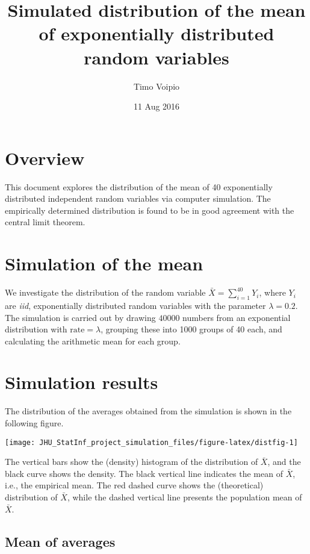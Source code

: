 \documentclass[12pt,a4paper]{article}
\title{Simulated distribution of the mean of exponentially distributed random
variables}
\author{Timo Voipio}
\date{11 Aug 2016}
\begin{document}
\maketitle

\section{Overview}\label{overview}

This document explores the distribution of the mean of 40 exponentially
distributed independent random variables via computer simulation. The
empirically determined distribution is found to be in good agreement
with the central limit theorem.

\section{Simulation of the mean}\label{simulation-of-the-mean}

We investigate the distribution of the random variable
\(\bar{X} = \sum_{i=1}^{40} Y_i\), where \(Y_i\) are \emph{iid},
exponentially distributed random variables with the parameter
\(\lambda = 0.2\). The simulation is carried out by drawing \(40000\)
numbers from an exponential distribution with \(\text{rate} = \lambda\),
grouping these into 1000 groups of 40 each, and calculating the
arithmetic mean for each group.

\section{Simulation results}\label{simulation-results}

The distribution of the averages obtained from the simulation is shown
in the following figure.

\begin{center}\texttt{[image: JHU\_StatInf\_project\_simulation\_files/figure-latex/distfig-1]} \end{center}

The vertical bars show the (density) histogram of the distribution of
\(\bar{X}\), and the black curve shows the density. The black vertical
line indicates the mean of \(\bar{X}\), i.e., the empirical mean. The
red dashed curve shows the (theoretical) distribution of \(\bar{X}\),
while the dashed vertical line presents the population mean of
\(\bar{X}\).

\subsection{Mean of averages}\label{mean-of-averages}
\end{document}
